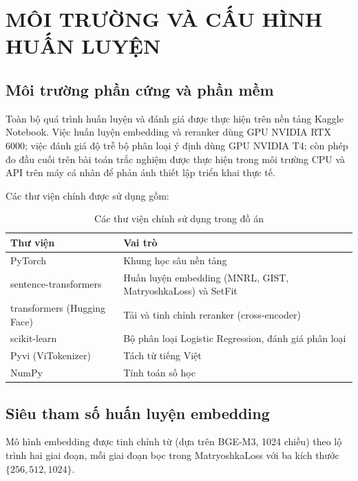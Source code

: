 \chapter{MÔI TRƯỜNG VÀ CẤU HÌNH HUẤN LUYỆN}
\label{appendix:A}

\section{Môi trường phần cứng và phần mềm}
\label{appendix:A.1}

Toàn bộ quá trình huấn luyện và đánh giá được thực hiện trên nền tảng Kaggle Notebook. Việc huấn luyện embedding và reranker dùng GPU NVIDIA RTX 6000; việc đánh giá độ trễ bộ phân loại ý định dùng GPU NVIDIA T4; còn phép đo đầu cuối trên bài toán trắc nghiệm được thực hiện trong môi trường CPU và API trên máy cá nhân để phản ánh thiết lập triển khai thực tế.

Các thư viện chính được sử dụng gồm:

\begin{table}[H]
    \centering
    \caption{Các thư viện chính sử dụng trong đồ án}
    \label{tab:appendix-libraries}
    {\small
    \begin{tabular}{|>{\raggedright\arraybackslash}p{5.0cm}|>{\raggedright\arraybackslash}p{8.0cm}|}
        \hline
        \textbf{Thư viện} & \textbf{Vai trò} \\ \hline
        PyTorch & Khung học sâu nền tảng \\ \hline
        sentence-transformers & Huấn luyện embedding (MNRL, GIST, MatryoshkaLoss) và SetFit \\ \hline
        transformers (Hugging Face) & Tải và tinh chỉnh reranker (cross-encoder) \\ \hline
        scikit-learn & Bộ phân loại Logistic Regression, đánh giá phân loại \\ \hline
        Pyvi (ViTokenizer) & Tách từ tiếng Việt \\ \hline
        NumPy & Tính toán số học \\ \hline
    \end{tabular}
    }
\end{table}

\section{Siêu tham số huấn luyện embedding}
\label{appendix:A.2}

Mô hình embedding được tinh chỉnh từ  (dựa trên BGE-M3, 1024 chiều) theo lộ trình hai giai đoạn, mỗi giai đoạn bọc trong MatryoshkaLoss với ba kích thước $\{256, 512, 1024\}$.

